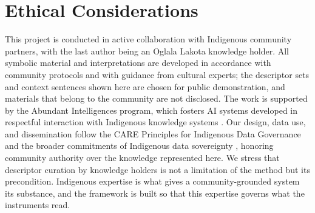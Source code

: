 \documentclass[final,creativeai]{article}
\begin{document}
\section{Ethical Considerations}
This project is conducted in active collaboration with Indigenous community partners, with the last author being an Oglala Lakota knowledge holder. All symbolic material and interpretations are developed in accordance with community protocols and with guidance from cultural experts; the descriptor sets and context sentences shown here are chosen for public demonstration, and materials that belong to the community are not disclosed. The work is supported by the Abundant Intelligences program, which fosters AI systems developed in respectful interaction with Indigenous knowledge systems \citep{lewis_indigenous_2020}. Our design, data use, and dissemination follow the CARE Principles for Indigenous Data Governance \citep{carroll_care_2020} and the broader commitments of Indigenous data sovereignty \citep{kukutai_indigenous_2016}, honoring community authority over the knowledge represented here. We stress that descriptor curation by knowledge holders is not a limitation of the method but its precondition. Indigenous expertise is what gives a community-grounded system its substance, and the framework is built so that this expertise governs what the instruments read.



\end{document}
